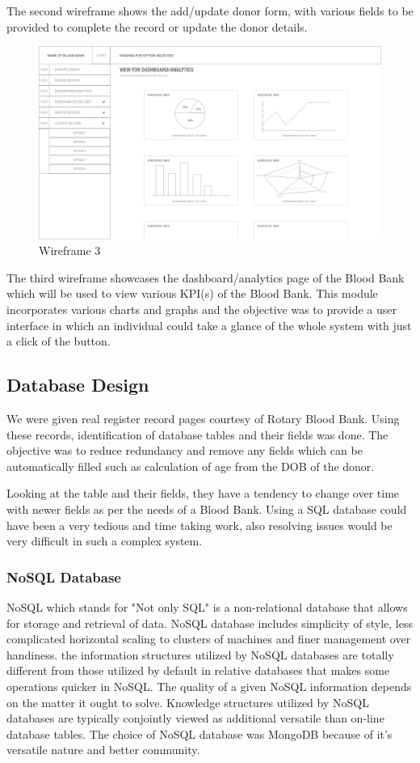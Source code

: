 \documentclass[BTech]{srmuthesis}
\begin{document}
The second wireframe shows the add/update donor form, with various fields to be provided to complete the record or update the donor details.\par
\begin{figure}[h!]
	\centering
	\includegraphics[scale=0.2]{wireframe3.png}
	\caption{Wireframe 3}
\end{figure}
The third wireframe showcases the dashboard/analytics page of the Blood Bank which will be used to view various \ac{KPI}(s) of the Blood Bank. This module incorporates various charts and graphs and the objective was to provide a user interface in which an individual could take a glance of the whole system with just a click of the button.
\subsection{Database Design}
We were given real register record pages courtesy of Rotary Blood Bank. Using these records, identification of database tables and their fields was done. The objective was to reduce redundancy and remove any fields which can be automatically filled such as calculation of age from the \ac{DOB} of the donor.\par
Looking at the table and their fields, they have a tendency to change over time with newer fields as per the needs of a Blood Bank. Using a SQL database could have been a very tedious and time taking work, also resolving issues would be very difficult in such a complex system.\par
\subsubsection{NoSQL Database}
NoSQL which stands for "Not only SQL" is a non-relational database that allows for storage and retrieval of data. NoSQL database includes simplicity of style, less complicated horizontal scaling to clusters of machines and finer management over handiness. the information structures utilized by NoSQL databases are totally different from those utilized by default in relative databases that makes some operations quicker in NoSQL. The quality of a given NoSQL information depends on the matter it ought to solve. Knowledge structures utilized by NoSQL databases are typically conjointly viewed as additional versatile than on-line database tables. The choice of NoSQL database was MongoDB because of it's versatile nature and better community. \cite{gfg_nosql} \newline
	
\end{document}
